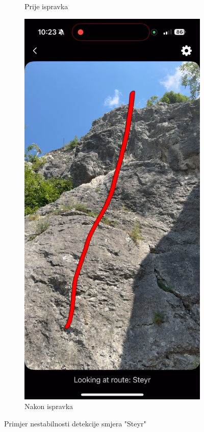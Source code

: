 \begin{figure}[H]
\begin{subfigure}[b]{0.45\textwidth}
        \caption{Prije ispravka}
        \label{fig:steyr_bad_detection_before_fix}
    \end{subfigure}
    \hfill
    \begin{subfigure}[b]{0.45\textwidth}
        \centering
        \includegraphics[width=\textwidth]{images/testiranje/steyr_bad_detection_after_homography_fix.png}
        \caption{Nakon ispravka}
        \label{fig:steyr_bad_detection_after_fix}
    \end{subfigure}
    \caption{Primjer nestabilnosti detekcije smjera "Steyr"}
    \label{fig:steyr_bad_detection_double_3}
\end{figure}



